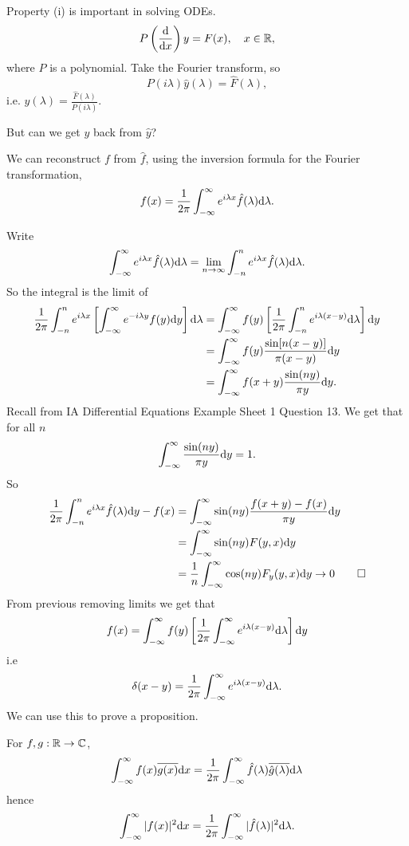 \documentclass{article}
\begin{document}
Property (i) is important in solving ODEs.
\[
	P\left(\frac{\mathrm d}{\mathrm dx}\right)y=F(x),\quad x\in \mathbb{R},
\]
where $ P $ is a polynomial. Take the Fourier transform, so
\[
  P(i\lambda)\hat y(\lambda)=\hat F(\lambda),
\]
i.e. $ \hat y(\lambda)=\frac{\hat F(\lambda)}{P(i\lambda)} $.
\par
But can we get $ y $ back from $ \hat y $?
\begin{proposition}
  We can reconstruct $ f $ from $ \hat f $, using the inversion formula for the Fourier transformation,
  \[
	  f(x)=\frac1{2\pi}\int_{-\infty}^\infty e^{i\lambda x}\hat f(\lambda)\mathrm d\lambda.
  \]
\end{proposition}
\pf Write
\[
	\int_{-\infty}^\infty e^{i\lambda x}\hat f(\lambda)\mathrm d\lambda=\lim_{n\to\infty} \int_{-n}^n  e^{i\lambda x}\hat f(\lambda)\mathrm d\lambda.
\]
So the integral is the limit of
\begin{align*}
	\frac1{2\pi}\int_{-n}^ne^{i\lambda x}\left[\int_{-\infty}^\infty e^{-i\lambda y }f(y)\mathrm dy\right]\mathrm d\lambda&= \int_{-\infty}^\infty f(y)\left[\frac1{2\pi}\int_{-n}^ne^{i\lambda(x-y)}\mathrm d\lambda\right]\mathrm dy\\
													       &=\int_{-\infty}^\infty f(y)\frac{\sin[n(x-y)]}{\pi(x-y)}\mathrm dy\\
													       &= \int_{-\infty}^\infty f(x+y)\frac{\sin(ny)}{\pi y}\mathrm dy.
\end{align*}
Recall from IA Differential Equations Example Sheet 1 Question 13. We get that for all $ n $
\[
	\int_{-\infty}^\infty \frac{\sin(ny)}{\pi y}\mathrm dy=1.
\]
So
\begin{align*}
	\frac{1}{2\pi}\int_{-n}^{n}e^{i\lambda x}\hat{f}(\lambda)\mathrm dy-f(x)&= \int_{-\infty}^\infty \sin(ny)\frac{f(x+y)-f(x)}{\pi y}\mathrm dy\\
									   &= \int_{-\infty}^\infty \sin(ny)F(y,x)\mathrm dy\\
									   &=\frac{1}{n}\int_{-\infty}^\infty \cos(ny)F_y(y,x)\mathrm dy\to 0\qed
\end{align*}
From previous removing limits we get that
\[
	f(x)=\int_{-\infty}^\infty f(y)\left[\frac1{2\pi}\int_{-\infty}^\infty e^{i\lambda(x-y)}\mathrm d\lambda\right]\mathrm dy
\]
i.e
\[
	\delta(x-y)=\frac1{2\pi}\int_{-\infty}^\infty e^{i\lambda(x-y)}\mathrm d\lambda.
\]
We can use this to prove a proposition.
\begin{proposition}
	For $ f,g:\mathbb{R}\to \mathbb{C} $,
	\[
		\int_{-\infty}^\infty f(x)\overline{g(x)}\mathrm dx=\frac1{2\pi}\int_{-\infty}^\infty \hat f(\lambda)\overline{\hat g(\lambda)}\mathrm d\lambda
	\]
	hence
	\[
		\int_{-\infty}^\infty|f(x)|^2\mathrm dx=\frac1{2\pi}\int_{-\infty}^\infty|\hat f(\lambda)|^2\mathrm d\lambda.
	\]
\end{proposition}
\end{document}
